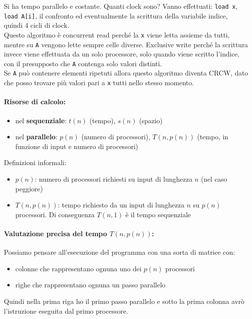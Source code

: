 \documentclass[11pt]{article}
\begin{document}
	Si ha tempo parallelo e costante. Quanti clock sono? Vanno effettuati: \texttt{load x}, \texttt{load A[i]}, il confronto ed eventualmente la scrittura della variabile indice, quindi $4$ cicli di clock.\\
	
	Questo algoritmo è concurrent read perché la \texttt{x} viene letta assieme da tutti, mentre su \texttt{A} vengono lette sempre celle diverse. Exclusive write perché la scrittura invece viene effettuata da un solo processore, solo quando viene scritto l'indice, con il presupposto che \texttt{A} contenga solo valori distinti.\\
	
	Se \texttt{A} può contenere elementi ripetuti allora questo algoritmo diventa CRCW, dato che posso trovare più valori pari a \texttt{x} tutti nello stesso momento.\\
	
	\paragraph{Risorse di calcolo:}
	\begin{itemize}
		\item nel \textbf{sequenziale}: $t(n)$ (tempo), $s(n)$ (spazio)
		\item nel \textbf{parallelo}: $p(n)$ (numero di processori), $T(n, p(n))$ (tempo, in funzione di input e numero di processori)
	\end{itemize}
	
	Definizioni informali: 
	\begin{itemize}
		\item $p(n)$: numero di processori richiesti su input di lunghezza $n$ (nel caso peggiore)
		\item $T(n, p(n))$: tempo richiesto da un input di lunghezza $n$ su $p(n)$ processori. Di conseguenza $T(n, 1)$ è il tempo sequenziale 
	\end{itemize}
	


	
	\newpage
	
	\paragraph{Valutazione precisa del tempo $T(n, p(n))$:} Possiamo pensare all'esecuzione del programma con una sorta di matrice con: 
	\begin{itemize}
		\item colonne che rappresentano ognuna uno dei $p(n)$ processori
		\item righe che rappresentano ognuna un passo parallelo 
	\end{itemize}
	Quindi nella prima riga ho il primo passo parallelo e sotto la prima colonna avrò l'istruzione eseguita dal primo processore.\\
	
\end{document}
